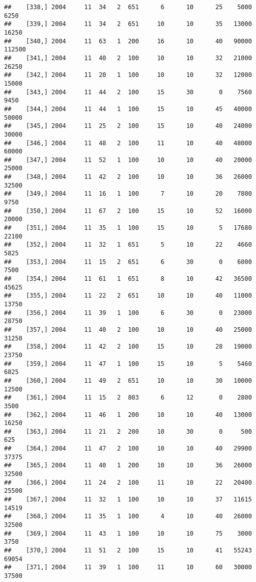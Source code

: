 \documentclass{article}\usepackage[]{graphicx}\usepackage[]{color}
\makeatletter
\newenvironment{kframe}{%
 \def\at@end@of@kframe{}%
 \ifinner\ifhmode%
  \def\at@end@of@kframe{\end{minipage}}%
  \begin{minipage}{\columnwidth}%
 \fi\fi%
 \def\FrameCommand##1{\hskip\@totalleftmargin \hskip-\fboxsep
 \colorbox{shadecolor}{##1}\hskip-\fboxsep
     \hskip-\linewidth \hskip-\@totalleftmargin \hskip\columnwidth}%
 \MakeFramed {\advance\hsize-\width
   \@totalleftmargin\z@ \linewidth\hsize
   \@setminipage}}%
 {\par\unskip\endMakeFramed%
 \at@end@of@kframe}
\newenvironment{knitrout}{}{} %
\makeatother
\begin{document}
\begin{knitrout}
\begin{kframe}
\begin{verbatim}
##    [338,] 2004     11  34   2  651      6      10      25    5000    6250
##    [339,] 2004     11  34   2  651     10      10      35   13000   16250
##    [340,] 2004     11  63   1  200     16      10      40   90000  112500
##    [341,] 2004     11  40   2  100     10      10      32   21000   26250
##    [342,] 2004     11  20   1  100     10      10      32   12000   15000
##    [343,] 2004     11  44   2  100     15      30       0    7560    9450
##    [344,] 2004     11  44   1  100     15      10      45   40000   50000
##    [345,] 2004     11  25   2  100     15      10      40   24000   30000
##    [346,] 2004     11  48   2  100     11      10      40   48000   60000
##    [347,] 2004     11  52   1  100     10      10      40   20000   25000
##    [348,] 2004     11  42   2  100     10      10      36   26000   32500
##    [349,] 2004     11  16   1  100      7      10      20    7800    9750
##    [350,] 2004     11  67   2  100     15      10      52   16000   20000
##    [351,] 2004     11  35   1  100     15      10       5   17680   22100
##    [352,] 2004     11  32   1  651      5      10      22    4660    5825
##    [353,] 2004     11  15   2  651      6      30       0    6000    7500
##    [354,] 2004     11  61   1  651      8      10      42   36500   45625
##    [355,] 2004     11  22   2  651     10      10      40   11000   13750
##    [356,] 2004     11  39   1  100      6      30       0   23000   28750
##    [357,] 2004     11  40   2  100     10      10      40   25000   31250
##    [358,] 2004     11  42   2  100     15      10      28   19000   23750
##    [359,] 2004     11  47   1  100     15      10       5    5460    6825
##    [360,] 2004     11  49   2  651     10      10      30   10000   12500
##    [361,] 2004     11  15   2  803      6      12       0    2800    3500
##    [362,] 2004     11  46   1  200     10      10      40   13000   16250
##    [363,] 2004     11  21   2  200     10      30       0     500     625
##    [364,] 2004     11  47   2  100     10      10      40   29900   37375
##    [365,] 2004     11  40   1  200     10      10      36   26000   32500
##    [366,] 2004     11  24   2  100     11      10      22   20400   25500
##    [367,] 2004     11  32   1  100     10      10      37   11615   14519
##    [368,] 2004     11  35   1  100      4      10      40   26000   32500
##    [369,] 2004     11  43   1  100     10      10      75    3000    3750
##    [370,] 2004     11  51   2  100     15      10      41   55243   69054
##    [371,] 2004     11  39   1  100     11      10      60   30000   37500

\end{verbatim}
\end{kframe}
\end{knitrout}
\end{document}

